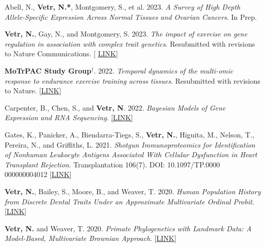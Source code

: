 \documentclass[12pt]{article}
\begin{document}
\begin{enumerate}[label={[\arabic*]}]



\item Abell, N., \textbf{Vetr, N.*},  Montgomery, S., et al.  2023.  \emph{A Survey of High Depth Allele-Specific Expression Across Normal Tissues and Ovarian Cancers}.  In Prep.

\item \textbf{Vetr, N.},  Gay,  N.,  and Montgomery,  S.  2023.  \emph{The impact of exercise on gene regulation in association with complex trait genetics}.  Resubmitted with revisions to Nature Communications. [ \href{https://github.com/NikVetr/MoTrPAC_Complex_Traits}{LINK}]

\item \textbf{MoTrPAC Study Group}$^{\dag}$. 2022.  \emph{Temporal dynamics of the multi-omic response to endurance exercise training across tissues}.  Resubmitted with revisions to Nature.  [\href{https://www.biorxiv.org/content/10.1101/2022.09.21.508770v2}{LINK}]

\item  Carpenter,  B.,  Chen,  S.,  and \textbf{Vetr,  N}.  2022.  \emph{Bayesian Models of Gene Expression and RNA Sequencing}.  \href{https://github.com/bob-carpenter/BayesExpress/blob/main/latex/bayes-express/bayes-express.tex}{[LINK]}

\item Gates, K., Panicker, A., Biendarra-Tiegs, S., \textbf{Vetr, N.}, Higuita, M., Nelson, T., Pereira, N., and Griffiths, L. 2021.  \emph{Shotgun Immunoproteomics for Identification of Nonhuman Leukocyte Antigens Associated With Cellular Dysfunction in Heart Transplant Rejection}. Transplantation 106(7). DOI: 10.1097/TP.0000\\000000004012 [\href{https://pubmed.ncbi.nlm.nih.gov/34923540/}{LINK}]

\item \textbf{Vetr, N.}, Bailey, S., Moore, B., and Weaver, T. 2020.  \emph{Human Population History from Discrete Dental Traits Under an Approximate Multivariate Ordinal Probit}. [\href{https://github.com/NikVetr/papers/blob/main/plosone-manuscript/mvBM_manuscript_plosone.pdf}{LINK}]

\item \textbf{Vetr, N.} and Weaver, T. 2020.  \emph{Primate Phylogenetics with Landmark Data: A Model-Based, Multivariate Brownian Approach}. [\href{https://github.com/NikVetr/papers/blob/main/jhe-manuscript/mvBM_manuscript_JHE.pdf}{LINK}]


\end{enumerate}
\end{document}
